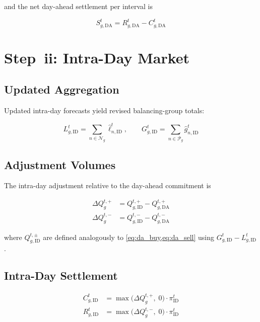 \documentclass[12pt,a4paper]{article}
\begin{document}
and the net day-ahead settlement per interval is

\begin{equation}
S_{g,\mathrm{DA}}^{t} = R_{g,\mathrm{DA}}^{t} - C_{g,\mathrm{DA}}^{t}
\label{eq:da_net_settlement}
\end{equation}

\section{Step~ii: Intra-Day Market}

\subsection{Updated Aggregation}

Updated intra-day forecasts yield revised balancing-group totals:

\begin{equation}
L_{g,\mathrm{ID}}^{t}
  = \sum_{n \in \mathcal{N}_{g}} \hat{\ell}_{n,\mathrm{ID}}^{t}, \qquad
G_{g,\mathrm{ID}}^{t}
  = \sum_{n \in \mathcal{P}_{g}} \hat{g}_{n,\mathrm{ID}}^{t}
\label{eq:bg_id_agg}
\end{equation}

\subsection{Adjustment Volumes}

The intra-day adjustment relative to the day-ahead commitment is

\begin{align}
\Delta Q_{g}^{t,+}
  &= Q_{g,\mathrm{ID}}^{t,+} - Q_{g,\mathrm{DA}}^{t,+}
  \label{eq:id_adj_buy}\\
\Delta Q_{g}^{t,-}
  &= Q_{g,\mathrm{ID}}^{t,-} - Q_{g,\mathrm{DA}}^{t,-}
  \label{eq:id_adj_sell}
\end{align}

where $Q_{g,\mathrm{ID}}^{t,\pm}$ are defined analogously to
\cref{eq:da_buy,eq:da_sell} using $G_{g,\mathrm{ID}}^{t} - L_{g,\mathrm{ID}}^{t}$.

\subsection{Intra-Day Settlement}

\begin{align}
C_{g,\mathrm{ID}}^{t} &= \max\!\bigl(\Delta Q_{g}^{t,+},\;0\bigr)
  \cdot \pi_{\mathrm{ID}}^{t}
  \label{eq:id_cost}\\
R_{g,\mathrm{ID}}^{t} &= \max\!\bigl(\Delta Q_{g}^{t,-},\;0\bigr)
  \cdot \pi_{\mathrm{ID}}^{t}
  \label{eq:id_rev}
\end{align}
\end{document}
